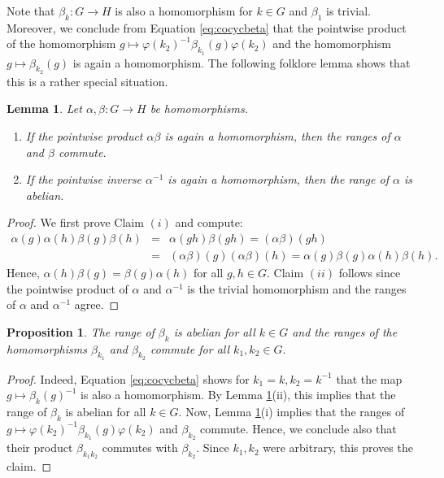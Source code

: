 \documentclass[a4paper,11pt]{amsproc}
\theoremstyle{plain}
\newtheorem{proposition}[theorem]{Proposition}
\newtheorem{lemma}[theorem]{Lemma}
\theoremstyle{definition}
\begin{document}
Note that $\beta_k \colon G \to H$ is also a homomorphism for $k \in G$ and $\beta_1$ is trivial. Moreover, we conclude from Equation \eqref{eq:cocycbeta} that the pointwise product of the homomorphism $g \mapsto \varphi(k_2)^{-1}\beta_{k_1}(g)\varphi(k_2)$ and the homomorphism $g \mapsto \beta_{k_2}(g)$ is again a homomorphism. The following folklore lemma shows that this is a rather special situation.

\begin{lemma} \label{lem:comm}
Let $\alpha,\beta \colon G \to H$ be homomorphisms. \begin{enumerate}[$(i)$]
\item If the pointwise product $\alpha \beta$ is again a homomorphism, then the ranges of $\alpha$ and $\beta$ commute. \item If the pointwise inverse $\alpha^{-1}$ is again a homomorphism, then the range of $\alpha$ is abelian.
\end{enumerate}
\end{lemma}
\begin{proof}
We first prove Claim $(i)$ and compute:
\begin{eqnarray*}
\alpha(g)\alpha(h)\beta(g) \beta(h) &=& \alpha(gh)\beta(gh) = (\alpha\beta)(gh) \\&=& (\alpha \beta)(g)(\alpha \beta)(h) =\alpha(g)\beta(g)\alpha(h)\beta(h).
\end{eqnarray*}
Hence, $\alpha(h)\beta(g)=\beta(g)\alpha(h)$ for all $g,h \in G.$ Claim $(ii)$ follows since the pointwise product of $\alpha$ and $\alpha^{-1}$ is the trivial homomorphism and the ranges of $\alpha$ and $\alpha^{-1}$ agree.
\end{proof}

\begin{proposition} \label{prop:comm} The range of $\beta_k$ is abelian for all $k \in G$ and the ranges of the homomorphisms $\beta_{k_1}$ and $\beta_{k_2}$ commute for all $k_1,k_2 \in G.$ 
\end{proposition}
\begin{proof}
Indeed, Equation \eqref{eq:cocycbeta} shows for $k_1=k,k_2=k^{-1}$ that the map $g \mapsto \beta_k(g)^{-1}$ is also a homomorphism. By Lemma \ref{lem:comm}(ii), this implies that the range of $\beta_k$ is abelian for all $k \in G$. Now, Lemma \ref{lem:comm}(i) implies that the ranges of $g \mapsto \varphi(k_2)^{-1}\beta_{k_1}(g)\varphi(k_2)$ and $\beta_{k_2}$ commute. Hence, we conclude also that their product $\beta_{k_1k_2}$ commutes with $\beta_{k_2}$. Since $k_1,k_2$ were arbitrary, this proves the claim.
\end{proof}
\end{document}
